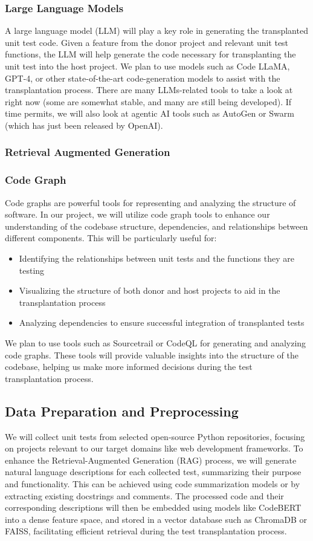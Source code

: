 \documentclass[sigconf]{acmart}
\begin{document}
\subsubsection{Large Language Models}
A large language model (LLM) will play a key role in generating the transplanted unit test code. Given a feature from the donor project and relevant unit test functions, the LLM will help generate the code necessary for transplanting the unit test into the host project. We plan to use models such as Code LLaMA, GPT-4, or other state-of-the-art code-generation models to assist with the transplantation process. There are many LLMs-related tools to take a look at right now (some are somewhat stable, and many are still being developed). If time permits, we will also look at agentic AI tools such as AutoGen or Swarm (which has just been released by OpenAI).
\subsubsection{Retrieval Augmented Generation}

\subsubsection{Code Graph}
Code graphs are powerful tools for representing and analyzing the structure of software. In our project, we will utilize code graph tools to enhance our understanding of the codebase structure, dependencies, and relationships between different components. This will be particularly useful for:
\begin{itemize}
\item Identifying the relationships between unit tests and the functions they are testing
\item Visualizing the structure of both donor and host projects to aid in the transplantation process
\item Analyzing dependencies to ensure successful integration of transplanted tests
\end{itemize}
We plan to use tools such as Sourcetrail or CodeQL for generating and analyzing code graphs. These tools will provide valuable insights into the structure of the codebase, helping us make more informed decisions during the test transplantation process.
\subsection{Data Preparation and Preprocessing}
We will collect unit tests from selected open-source Python repositories, focusing on
projects relevant to our target domains like web development frameworks. To enhance the
Retrieval-Augmented Generation (RAG) process, we will generate natural language descriptions
for each collected test, summarizing their purpose and functionality. This can be achieved using
code summarization models or by extracting existing docstrings and comments. The processed code and their corresponding
descriptions will then be embedded using models like CodeBERT into a dense feature space, and stored in a vector database
such as ChromaDB or FAISS, facilitating efficient retrieval during the test transplantation process.
\end{document}
